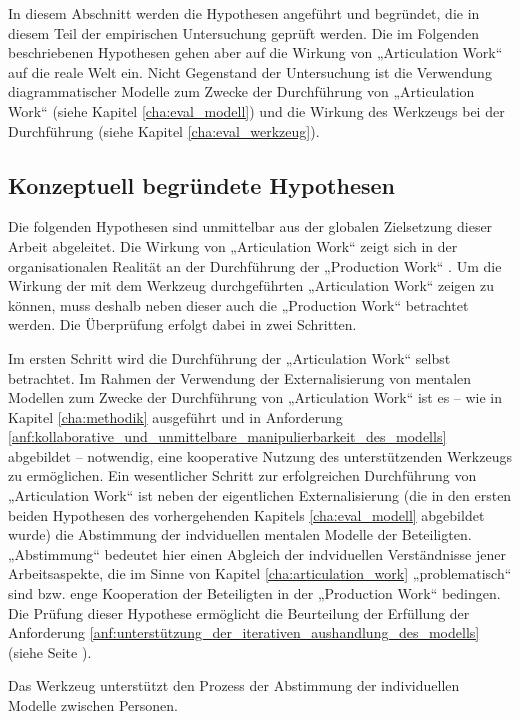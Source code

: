 In diesem Abschnitt werden die Hypothesen angeführt und begründet, die in diesem Teil der empirischen Untersuchung geprüft werden. Die im Folgenden beschriebenen Hypothesen gehen aber auf die Wirkung von „Articulation Work“ auf die reale Welt ein. Nicht Gegenstand der Untersuchung ist die Verwendung diagrammatischer Modelle zum Zwecke der Durchführung von „Articulation Work“ (siehe Kapitel \ref{cha:eval_modell}) und die Wirkung des Werkzeugs bei der Durchführung (siehe Kapitel \ref{cha:eval_werkzeug}).

\subsection{Konzeptuell begründete Hypothesen} %
\label{sub:a_konzeptuell_begründete_hypothesen}

Die folgenden Hypothesen sind unmittelbar aus der globalen Zielsetzung dieser Arbeit abgeleitet. Die Wirkung von „Articulation Work“ zeigt sich in der organisationalen Realität an der Durchführung der „Production Work“ \citet{Fujimura87}. Um die Wirkung der mit dem Werkzeug durchgeführten „Articulation Work“ zeigen zu können, muss deshalb neben dieser auch die „Production Work“ betrachtet werden. Die Überprüfung erfolgt dabei in zwei Schritten. 

Im ersten Schritt wird die Durchführung der „Articulation Work“ selbst betrachtet. Im Rahmen der Verwendung der Externalisierung von mentalen Modellen zum Zwecke der Durchführung von „Articulation Work“ ist es -- wie in Kapitel \ref{cha:methodik} ausgeführt und in Anforderung \ref{anf:kollaborative_und_unmittelbare_manipulierbarkeit_des_modells} abgebildet -- notwendig, eine kooperative Nutzung des unterstützenden Werkzeugs zu ermöglichen. Ein wesentlicher Schritt zur erfolgreichen Durchführung von „Articulation Work“ ist neben der eigentlichen Externalisierung (die in den ersten beiden Hypothesen des vorhergehenden Kapitels \ref{cha:eval_modell} abgebildet wurde) die Abstimmung der indviduellen mentalen Modelle der Beteiligten. „Abstimmung“ bedeutet hier einen Abgleich der indviduellen Verständnisse jener Arbeitsaspekte, die im Sinne von Kapitel \ref{cha:articulation_work} „problematisch“ sind bzw. enge Kooperation der Beteiligten in der „Production Work“ bedingen. Die Prüfung dieser Hypothese ermöglicht die Beurteilung der Erfüllung der Anforderung \ref{anf:unterstützung_der_iterativen_aushandlung_des_modells} (siehe Seite \pageref{anf:unterstützung_der_iterativen_aushandlung_des_modells}).

\begin{hyp}
	\label{hyp:abstimmung}
	Das Werkzeug unterstützt den Prozess der Abstimmung der individuellen Modelle zwischen Personen.
\end{hyp}

